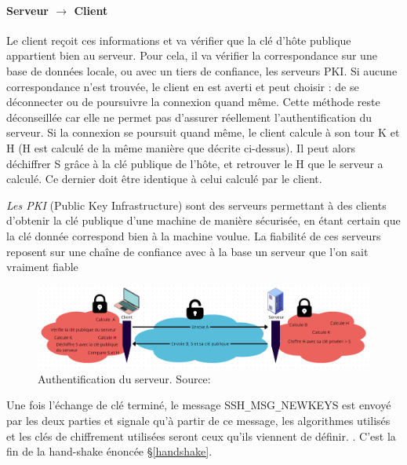 \paragraph{Serveur $\rightarrow$ Client}
Le client reçoit ces informations et va vérifier que la clé d'hôte publique appartient bien au serveur. Pour cela, il va vérifier la correspondance sur une base de données locale, ou avec un tiers de confiance, les serveurs PKI. Si aucune correspondance n'est trouvée, le client en est averti et peut choisir : de se déconnecter ou de poursuivre la connexion quand même. Cette méthode reste déconseillée car elle ne permet pas d'assurer réellement l'authentification du serveur. Si la connexion se poursuit quand même, le client calcule à son tour K et H (H est calculé de la même manière que décrite ci-dessus). Il peut alors déchiffrer S grâce à la clé publique de l'hôte, et retrouver le H que le serveur a calculé. Ce dernier doit être identique à celui calculé par le client.\cite{lonvick_secure_2006} \\

\begin{leftbar}
    \emph{Les PKI} (Public Key Infrastructure) sont des serveurs permettant à des clients d'obtenir la clé publique d'une machine de manière sécurisée, en étant certain que la clé donnée correspond bien à la machine voulue. La fiabilité de ces serveurs reposent sur une chaîne de confiance avec à la base un serveur que l'on sait \og vraiment fiable \fg \cite{perlman_overview_1999}
\end{leftbar}

\begin{figure}[H]
    \centering
    \includegraphics[width=1\linewidth]{images/Authentification serveur.png}
    \caption{Authentification du serveur. Source: \cite{cadegros_authentification_2023-1}}
\end{figure}

Une fois l'échange de clé terminé, le message {\ttfamily SSH\verb|_|MSG\verb|_|NEWKEYS} est envoyé par les deux parties et signale qu'à partir de ce message, les algorithmes utilisés et les clés de chiffrement utilisées seront ceux qu'ils viennent de définir. \cite{lonvick_secure_2006}. C'est la fin de la hand-shake énoncée §\ref{handshake}.

